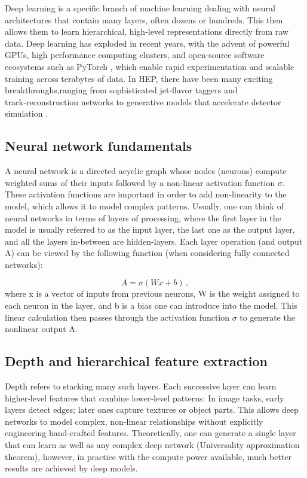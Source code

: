 Deep learning is a specific branch of machine learning dealing with neural architectures that contain many layers, often dozens or hundreds. This then allows them to learn hierarchical, high‑level representations directly from raw data. Deep learning has exploded in recent years, with the advent of powerful GPUs, high performance computing clusters, and open‑source software ecosystems such as  PyTorch \cite{paszke_pytorch_2019}, which enable rapid experimentation and scalable training across terabytes of data. In HEP, there have been many exciting breakthroughs,ranging from sophisticated jet‑flavor taggers \cite{duperrin_flavour_2023} and track‑reconstruction networks \cite{biscarat_towards_2021} to generative models that accelerate detector simulation \cite{hariri_graph_2021}.

\subsection{Neural network fundamentals}
A neural network is a directed acyclic graph whose nodes (neurons) compute weighted sums of their inputs followed by a non‑linear activation function $\sigma$. These activation functions are important in order to add non-linearity to the model, which allows it to model complex patterns. Usually, one can think of neural networks in terms of layers of processing, where the first layer in the model is usually referred to as the input layer, the last one as the output layer, and all the layers in-between are hidden-layers. Each layer operation (and output A) can be viewed by the following function (when considering fully connected networks):

\begin{equation}
	A = \sigma(Wx+b)\,,
\end{equation}
where x is a vector of inputs from previous neurons, W is the weight assigned to each neuron in the layer, and b is a bias one can introduce into the model. This linear calculation then passes through the activation function $\sigma$ to generate the nonlinear output A.

\subsection{Depth and hierarchical feature extraction}

Depth refers to stacking many such layers. Each successive layer can learn higher‑level features that combine lower‑level patterns: In image tasks, early layers detect edges; later ones capture textures or object parts. This allows deep networks to model complex, non‑linear relationships without explicitly engineering hand‑crafted features. Theoretically, one can generate a single layer that can learn as well as any complex deep network (Universality approximation theorem), however, in practice with the compute power available, much better results are achieved by deep models.

